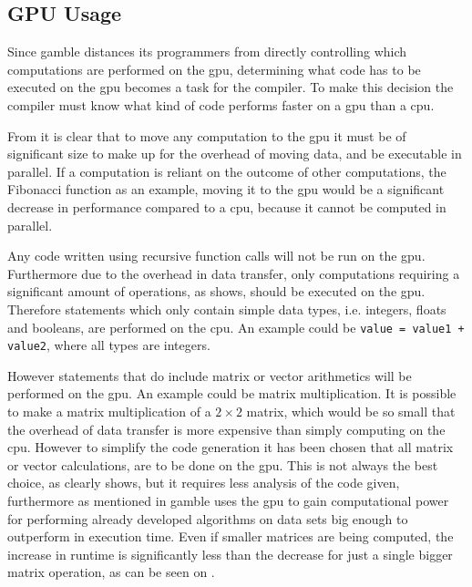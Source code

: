 \subsection*{GPU Usage}\label{GPUCode}
Since \gls{gamble} distances its programmers from directly controlling which computations are performed on the \acrshort{gpu}, determining what code has to be executed on the \acrshort{gpu} becomes a task for the compiler.
To make this decision the compiler must know what kind of code performs faster on a \acrshort{gpu} than a \acrshort{cpu}.

From  it is clear that to move any computation to the \acrshort{gpu} it must be of significant size to make up for the overhead of moving data, and be executable in parallel.
If a computation is reliant on the outcome of other computations, the Fibonacci function as an example, moving it to the \acrshort{gpu} would be a significant decrease in performance compared to a \acrshort{cpu}, because it cannot be computed in parallel.

Any code written using recursive function calls will not be run on the \acrshort{gpu}. 
Furthermore due to the overhead in data transfer, only computations requiring a significant amount of operations, as  shows, should be executed on the \acrshort{gpu}.
Therefore statements which only contain simple data types, i.e. integers, floats and booleans, are performed on the \acrshort{cpu}.
An example could be \texttt{value = value1 + value2}, where all types are integers.

However statements that do include matrix or vector arithmetics will be performed on the \acrshort{gpu}.
An example could be matrix multiplication.
It is possible to make a matrix multiplication of a $2\times2$ matrix, which would be so small that the overhead of data transfer is more expensive than simply computing on the \acrshort{cpu}. 
However to simplify the code generation it has been chosen that all matrix or vector calculations, are to be done on the \acrshort{gpu}.
This is not always the best choice, as  clearly shows, but it requires less analysis of the code given, furthermore as mentioned in  \gls{gamble} uses the \acrshort{gpu} to gain computational power for performing already developed algorithms on data sets big enough to outperform in execution time.
Even if smaller matrices are being computed, the increase in runtime is significantly less than the decrease for just a single bigger matrix operation, as can be seen on .
